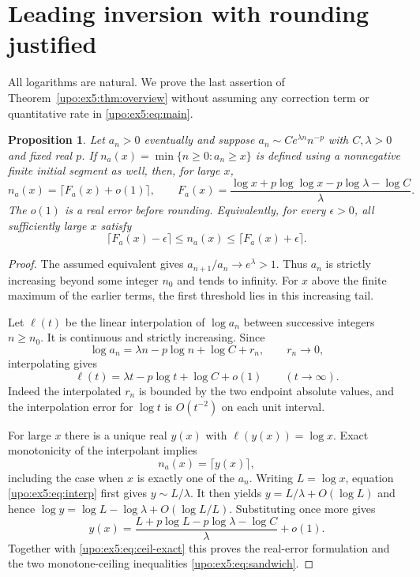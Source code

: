 \documentclass[11pt,letterpaper]{article}
\newtheorem{proposition}[theorem]{Proposition}
\theoremstyle{remark}\newtheorem{remark}[theorem]{Remark}
\numberwithin{equation}{section}
\begin{document}
\section{Leading inversion with rounding justified}\label{upo:ex5:sec:inverse}
All logarithms are natural. We prove the last assertion of
Theorem~\ref{upo:ex5:thm:overview} without assuming any correction term or quantitative rate in
\eqref{upo:ex5:eq:main}.

\begin{proposition}\label{upo:ex5:prop:inverse}
Let $a_n>0$ eventually and suppose
$a_n\sim C e^{\lambda n}n^{-p}$ with $C,\lambda>0$ and fixed real
$p$. If $n_a(x)=\min\{n\ge0:a_n\ge x\}$ is defined using a
nonnegative finite initial segment as well, then, for large $x$,
\[
 n_a(x)=\lceil F_a(x)+o(1)\rceil,
 \qquad
 F_a(x)=\frac{\log x+p\log\log x-p\log\lambda-\log C}{\lambda}.
\]
The $o(1)$ is a real error before rounding. Equivalently, for every
$\epsilon>0$, all sufficiently large $x$ satisfy
\begin{equation}\label{upo:ex5:eq:sandwich}
 \lceil F_a(x)-\epsilon\rceil
 \le n_a(x)\le
 \lceil F_a(x)+\epsilon\rceil.
\end{equation}
\end{proposition}
\begin{proof}
The assumed equivalent gives $a_{n+1}/a_n\to e^\lambda>1$.
Thus $a_n$ is strictly increasing beyond some integer $n_0$ and
tends to infinity. For $x$ above the finite maximum of the earlier
terms, the first threshold lies in this increasing tail.

Let $\ell(t)$ be the linear interpolation of $\log a_n$ between
successive integers $n\ge n_0$. It is continuous and strictly
increasing. Since
\[
 \log a_n=\lambda n-p\log n+\log C+r_n,
 \qquad r_n\to0,
\]
interpolating gives
\begin{equation}\label{upo:ex5:eq:interp}
 \ell(t)=\lambda t-p\log t+\log C+o(1)
 \qquad(t\to\infty).
\end{equation}
Indeed the interpolated $r_n$ is bounded by the two endpoint
absolute values, and the interpolation error for $\log t$ is
$O(t^{-2})$ on each unit interval.

For large $x$ there is a unique real $y(x)$ with
$\ell(y(x))=\log x$. Exact monotonicity of the interpolant implies
\begin{equation}\label{upo:ex5:eq:ceil-exact}
 n_a(x)=\lceil y(x)\rceil,
\end{equation}
including the case when $x$ is exactly one of the $a_n$.
Writing $L=\log x$, equation \eqref{upo:ex5:eq:interp} first gives
$y\sim L/\lambda$. It then yields
$y=L/\lambda+O(\log L)$ and hence
$\log y=\log L-\log\lambda+O(\log L/L)$.
Substituting once more gives
\[
 y(x)=\frac{L+p\log L-p\log\lambda-\log C}{\lambda}+o(1).
\]
Together with \eqref{upo:ex5:eq:ceil-exact} this proves the real-error
formulation and the two monotone-ceiling inequalities
\eqref{upo:ex5:eq:sandwich}.
\end{proof}
\end{document}
